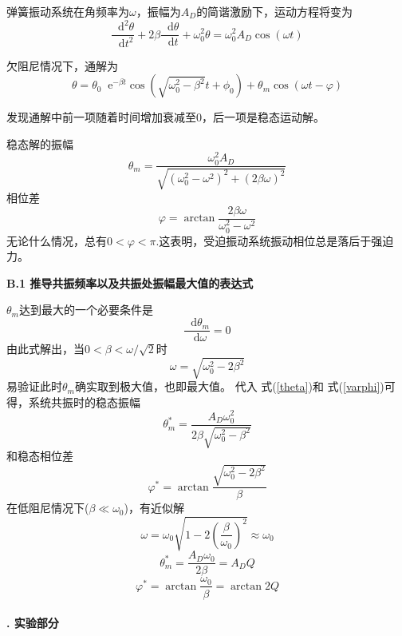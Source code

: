 \documentclass[a4paper,11pt]{article}
\newcommand*{\dif}{\mathop{}\!\mathrm{d}}
\newcommand*{\e}{\mathop{}\!\mathrm{e}}
\begin{document}
        弹簧振动系统在角频率为$\omega$，振幅为$A_D$的简谐激励下，运动方程将变为
        \begin{equation}
            \frac{\dif^2 \theta}{\dif t^2} + 2\beta \frac{\dif \theta}{\dif t} + \omega_0^2 \theta = \omega_0^2 A_D\cos(\omega t)
        \end{equation}

        欠阻尼情况下，通解为
        \begin{equation}
            \theta = \theta_0 \e^{-\beta t} \cos (\sqrt{\omega_0^2 - \beta^2}t + \phi_0) + \theta_m \cos(\omega t - \varphi)
            \label{eq: 受迫振动通解}
        \end{equation}

        发现通解中前一项随着时间增加衰减至0，后一项是稳态运动解。

        稳态解的振幅
        \begin{equation}
            \theta_m = \frac{\omega_0^2 A_D}{\sqrt{(\omega_0^2 - \omega^2)^2 + (2\beta\omega)^2}}
            \label{theta}
        \end{equation}
        相位差
        \begin{equation}
            \varphi = \arctan \frac{2\beta\omega}{\omega_0^2-\omega^2}
            \label{varphi}
        \end{equation}
        无论什么情况，总有$0<\varphi<\pi$.这表明，受迫振动系统振动相位总是落后于强迫力。

        \textbf{B.1 推导共振频率以及共振处振幅最大值的表达式}

        $\theta_m$达到最大的一个必要条件是
        \begin{equation}
            \frac{\dif \theta_m}{\dif \omega} = 0
        \end{equation}
        由此式解出，当$0<\beta<\omega / \sqrt2$时
        \begin{equation}
            \omega = \sqrt{\omega_0^2 - 2\beta^2}
        \end{equation}
        易验证此时$\theta_m$确实取到极大值，也即最大值。
        代入 式(\ref{theta})和 式(\ref{varphi})可得，系统共振时的稳态振幅
        \begin{equation}
            \theta^*_m = \frac{A_D\omega_0^2}{2\beta\sqrt{\omega_0^2-\beta^2}}
        \end{equation}
        和稳态相位差
        \begin{equation}
            \varphi^* = \arctan \frac{\sqrt{\omega_0^2-2\beta^2}}\beta
        \end{equation}
        在低阻尼情况下($\beta \ll \omega_0$)，有近似解
        \begin{equation}
            \omega = \omega_0\sqrt{1-2(\frac\beta{\omega_0})^2} \approx \omega_0
        \end{equation}
        \begin{equation}
            \theta^*_m = \frac{A_D\omega_0}{2\beta} = A_D Q
        \end{equation}
        \begin{equation}
            \varphi^* = \arctan \frac{\omega_0}{\beta} = \arctan 2Q
        \end{equation}
    ~\\
    \textbf{. 实验部分}
\end{document}

